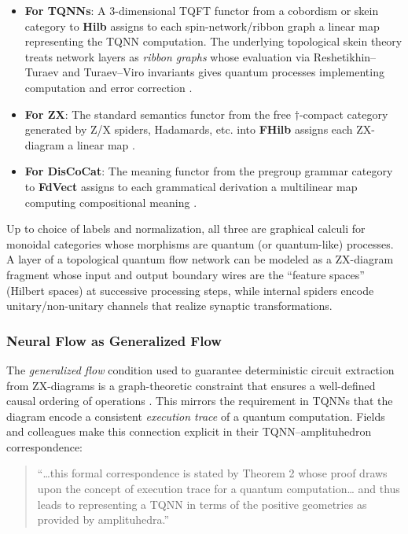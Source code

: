 \documentclass[
]{article}
\providecommand{\tightlist}{%
  \setlength{\itemsep}{0pt}\setlength{\parskip}{0pt}}
\numberwithin{equation}{section}
\begin{document}
\begin{itemize}
\tightlist
\item
  \textbf{For TQNNs}: A 3-dimensional TQFT functor from a cobordism or
  skein category to \textbf{Hilb} assigns to each spin-network/ribbon
  graph a linear map representing the TQNN computation. The underlying
  topological skein theory treats network layers as \emph{ribbon graphs}
  whose evaluation via Reshetikhin--Turaev and Turaev--Viro invariants
  gives quantum processes implementing computation and error correction
  \citep{fields2022tqnn, fields2025amplituhedra}.
\item
  \textbf{For ZX}: The standard semantics functor from the free
  \(\dagger\)-compact category generated by Z/X spiders, Hadamards, etc.
  into \textbf{FHilb} assigns each ZX-diagram a linear map
  \citep{kissinger2020zx}.
\item
  \textbf{For DisCoCat}: The meaning functor from the pregroup grammar
  category to \textbf{FdVect} assigns to each grammatical derivation a
  multilinear map computing compositional meaning
  \citep{coecke2010mathematical}.
\end{itemize}

Up to choice of labels and normalization, all three are graphical
calculi for monoidal categories whose morphisms are quantum (or
quantum-like) processes. A layer of a topological quantum flow network
can be modeled as a ZX-diagram fragment whose input and output boundary
wires are the ``feature spaces'' (Hilbert spaces) at successive
processing steps, while internal spiders encode unitary/non-unitary
channels that realize synaptic transformations.

\subsubsection{Neural Flow as Generalized
Flow}\label{neural-flow-as-generalized-flow}

The \emph{generalized flow} condition used to guarantee deterministic
circuit extraction from ZX-diagrams is a graph-theoretic constraint that
ensures a well-defined causal ordering of operations
\citep{kissinger2020zx}. This mirrors the requirement in TQNNs that the
diagram encode a consistent \emph{execution trace} of a quantum
computation. Fields and colleagues make this connection explicit in
their TQNN--amplituhedron correspondence:

\begin{quote}
``\ldots this formal correspondence is stated by Theorem 2 whose proof
draws upon the concept of execution trace for a quantum
computation\ldots{} and thus leads to representing a TQNN in terms of
the positive geometries as provided by amplituhedra.''
\citep{fields2025amplituhedra}
\end{quote}
\end{document}
